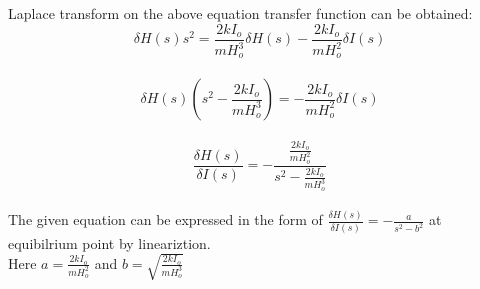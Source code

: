 \documentclass[20pt]{article}
\begin{document}
\noindent Laplace transform on the above equation transfer function can be obtained:\\

$$ \delta H(s) s^2 = \frac{2kI_o}{mH_o^3} \delta H(s) - \frac{2kI_o}{mH_o^2}\delta I(s)$$ \\
$$ \delta H(s)( s^2 -\frac{2kI_o}{mH_o^3}) = -\frac{2kI_o}{mH_o^2}\delta I(s) $$\\
$$ \frac{\delta H(s)}{\delta I(s)} = -\frac{\frac{2kI_o}{mH_o^2}}{s^2 -\frac{2kI_o}{mH_o^3}} $$\\ 

\noindent The given equation can be expressed in the form of  $ \frac{\delta H(s)}{\delta I(s)} = - \frac{a}{s^2-b^2} $ at\\ equibilrium point by lineariztion.\\ 
Here $ a = \frac{2kI_o}{mH_o^2} $ and 
$ b = \sqrt{\frac{2kI_o}{mH_o^3}}$
\end{document}
